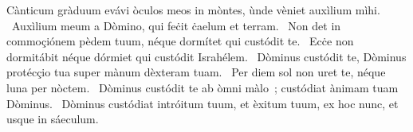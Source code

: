 { Cànticum gràduum}
{%
evávi òculos meos in mòntes, ùnde vèniet auxìlium mìhi. 
~Auxìlium meum a Dòmino, qui feċit ċaelum et terram. 
~Non det in commoçiónem pèdem tuum, néque dormítet qui custódit te. 
~Ecċe non dormitábit néque dórmiet qui custódit Israhélem. 
~Dòminus custódit te, Dòminus protécçio tua super mànum dèxteram tuam. 
~Per diem sol non uret te, néque luna per nòctem. 
~Dòminus custódit te ab òmni màlo~; custódiat ànimam tuam Dòminus. 
~Dòminus custódiat intróitum tuum, et èxitum tuum, ex hoc nunc, et usque in sáeculum. 
}
